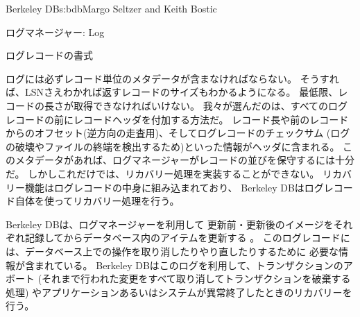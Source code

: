 \begin{aosachapter}{Berkeley DB}{s:bdb}{Margo Seltzer and Keith Bostic}
\begin{aosasect1}{ログマネージャー: Log}
\begin{aosasect2}{ログレコードの書式}

ログには必ずレコード単位のメタデータが含まなければならない。
そうすれば、LSNさえわかれば返すレコードのサイズもわかるようになる。
最低限、レコードの長さが取得できなければいけない。
我々が選んだのは、すべてのログレコードの前にレコードヘッダを付加する方法だ。
レコード長や前のレコードからのオフセット(逆方向の走査用)、そしてログレコードのチェックサム
(ログの破壊やファイルの終端を検出するため)といった情報がヘッダに含まれる。
このメタデータがあれば、ログマネージャーがレコードの並びを保守するには十分だ。
しかしこれだけでは、リカバリー処理を実装することができない。
リカバリー機能はログレコードの中身に組み込まれており、
Berkeley DBはログレコード自体を使ってリカバリー処理を行う。


Berkeley DBは、ログマネージャーを利用して
更新前・更新後のイメージをそれぞれ記録してからデータベース内のアイテムを更新する
\cite{bib:haerder:recovery}。
このログレコードには、データベース上での操作を取り消したりやり直したりするために
必要な情報が含まれている。
Berkeley DBはこのログを利用して、トランザクションのアボート
(それまで行われた変更をすべて取り消してトランザクションを破棄する処理)
やアプリケーションあるいはシステムが異常終了したときのリカバリーを行う。


\end{aosasect2}
\end{aosasect1}
\end{aosachapter}
